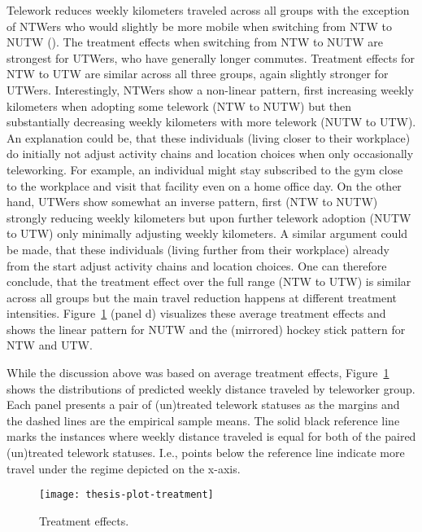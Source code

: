 \documentclass[%
    twoside, openright, titlepage, numbers=noenddot,%
    cleardoublepage=empty,%
    abstract=false,%
    BCOR=5.5mm, paper=a5, fontsize=10pt,%
]{scrreprt}
\begin{document}
Telework reduces weekly kilometers traveled across all groups with the exception of NTWers who would slightly be more mobile when switching from NTW to NUTW (). The treatment effects when switching from NTW to NUTW are strongest for UTWers, who have generally longer commutes. Treatment effects for NTW to UTW are similar across all three groups, again slightly stronger for UTWers. Interestingly, NTWers show a non-linear pattern, first increasing weekly kilometers when adopting some telework (NTW to NUTW) but then substantially decreasing weekly kilometers with more telework (NUTW to UTW). An explanation could be, that these individuals (living closer to their workplace) do initially not adjust activity chains and location choices when only occasionally teleworking. For example, an individual might stay subscribed to the gym close to the workplace and visit that facility even on a home office day. On the other hand, UTWers show somewhat an inverse pattern, first (NTW to NUTW) strongly reducing weekly kilometers but upon further telework adoption (NUTW to UTW) only minimally adjusting weekly kilometers. A similar argument could be made, that these individuals (living further from their workplace) already from the start adjust activity chains and location choices. One can therefore conclude, that the treatment effect over the full range (NTW to UTW) is similar across all groups but the main travel reduction happens at different treatment intensities. Figure~\ref{fig:treatment} (panel d) visualizes these average treatment effects and shows the linear pattern for NUTW and the (mirrored) hockey stick pattern for NTW and UTW.

While the discussion above was based on average treatment effects, Figure~\ref{fig:treatment} shows the distributions of predicted weekly distance traveled by teleworker group. Each panel presents a pair of (un)treated telework statuses as the margins and the dashed lines are the empirical sample means. The solid black reference line marks the instances where weekly distance traveled is equal for both of the paired (un)treated telework statuses. I.e., points below the reference line indicate more travel under the regime depicted on the x-axis.
%
%
\begin{figure}[t!]
\centering
\texttt{[image: thesis-plot-treatment]}
\caption{\label{fig:treatment} Treatment effects.}
\end{figure}
\end{document}
